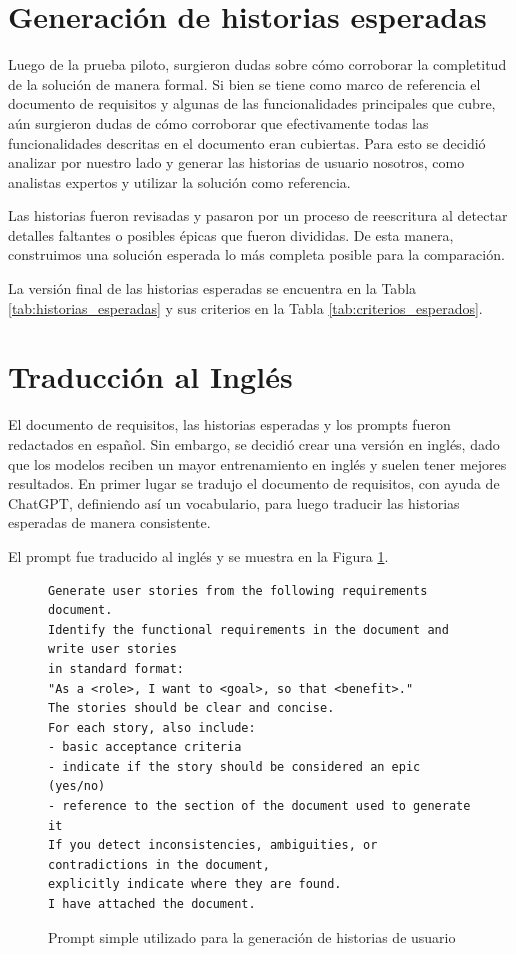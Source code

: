 \section{Generación de historias esperadas}

Luego de la prueba piloto, surgieron dudas sobre cómo corroborar la completitud de la solución de manera formal. Si bien se tiene como marco de referencia el documento de requisitos y algunas de las funcionalidades principales que cubre, aún surgieron dudas de cómo corroborar que efectivamente todas las funcionalidades descritas en el documento eran cubiertas. Para esto se decidió analizar por nuestro lado y generar las historias de usuario nosotros, como analistas expertos y utilizar la solución como referencia.

Las historias fueron revisadas y pasaron por un proceso de reescritura al detectar detalles faltantes o posibles épicas que fueron divididas. De esta manera, construimos una solución esperada lo más completa posible para la comparación.

La versión final de las historias esperadas se encuentra en la Tabla \ref{tab:historias_esperadas} y sus criterios en la Tabla \ref{tab:criterios_esperados}.

\section{Traducción al Inglés}
El documento de requisitos, las historias esperadas y los prompts fueron redactados en español. Sin embargo, se decidió crear una versión en inglés, dado que los modelos reciben un mayor entrenamiento en inglés \cite{zhang2023multilingualLLM} y suelen tener mejores resultados. En primer lugar se tradujo el documento de requisitos, con ayuda de ChatGPT, definiendo así un vocabulario, para luego traducir las historias esperadas de manera consistente.

El prompt fue traducido al inglés y se muestra en la Figura \ref{fig:prompt_simple}.

\begin{figure}[h!]
\begin{verbatim}
Generate user stories from the following requirements document.
Identify the functional requirements in the document and write user stories
in standard format:
"As a <role>, I want to <goal>, so that <benefit>."
The stories should be clear and concise.
For each story, also include:
- basic acceptance criteria
- indicate if the story should be considered an epic (yes/no)
- reference to the section of the document used to generate it
If you detect inconsistencies, ambiguities, or contradictions in the document,
explicitly indicate where they are found.
I have attached the document.
\end{verbatim}
\caption{Prompt simple utilizado para la generación de historias de usuario}
\label{fig:prompt_simple}
\end{figure}

